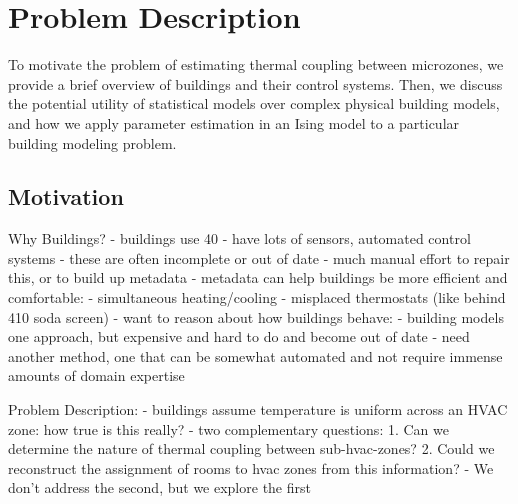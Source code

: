 \section{Problem Description}

To motivate the problem of estimating thermal coupling between microzones, we provide a brief overview of buildings and their control systems.
Then, we discuss the potential utility of statistical models over complex physical building models, and how we apply parameter estimation in an Ising model to a particular building modeling problem.

\subsection{Motivation}



Why Buildings?
- buildings use 40%
    - have lots of sensors, automated control systems
    - these are often incomplete or out of date
    - much manual effort to repair this, or to build up metadata
    - metadata can help buildings be more efficient and comfortable:
        - simultaneous heating/cooling
        - misplaced thermostats (like behind 410 soda screen)
    - want to reason about how buildings behave:
      - building models one approach, but expensive and hard to do and become out of date
      - need another method, one that can be somewhat automated and not require
        immense amounts of domain expertise

Problem Description:
- buildings assume temperature is uniform across an HVAC zone: how true is this really?
    - two complementary questions:
      1. Can we determine the nature of thermal coupling between sub-hvac-zones?
      2. Could we reconstruct the assignment of rooms to hvac zones from this information?
    - We don't address the second, but we explore the first

\fi
